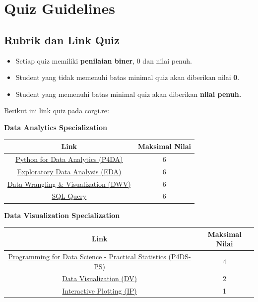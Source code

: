 \documentclass[
]{book}
\providecommand{\tightlist}{%
  \setlength{\itemsep}{0pt}\setlength{\parskip}{0pt}}
\begin{document}
\hypertarget{quiz-guidelines}{%
\section{Quiz Guidelines}\label{quiz-guidelines}}

\hypertarget{rubrik-dan-link-quiz}{%
\subsection{Rubrik dan Link Quiz}\label{rubrik-dan-link-quiz}}

\begin{itemize}
\tightlist
\item
  Setiap quiz memiliki \textbf{penilaian biner}, 0 dan nilai penuh.
\item
  Student yang tidak memenuhi batas minimal quiz akan diberikan nilai \textbf{0}.
\item
  Student yang memenuhi batas minimal quiz akan diberikan \textbf{nilai penuh.}
\end{itemize}

Berikut ini link quiz pada \url{corgi.re}:

\textbf{Data Analytics Specialization}

\begin{longtable}[]{@{}cc@{}}
\toprule
\textbf{Link} & \textbf{Maksimal Nilai}\tabularnewline
\midrule
\endhead
\href{https://corgi.re/courses/ttnsy/quiz_PYW1}{Python for Data Analytics (P4DA)} & 6\tabularnewline
\href{https://corgi.re/courses/ttnsy/quiz_PYW2}{Exploratory Data Analysis (EDA)} & 6\tabularnewline
\href{https://corgi.re/courses/ttnsy/quiz_PYW3}{Data Wrangling \& Visualization (DWV)} & 6\tabularnewline
\href{https://corgi.re/courses/ttnsy/quiz_PYW4}{SQL Query} & 6\tabularnewline
\bottomrule
\end{longtable}

\textbf{Data Visualization Specialization}

\begin{longtable}[]{@{}cc@{}}
\toprule
\textbf{Link} & \textbf{Maksimal Nilai}\tabularnewline
\midrule
\endhead
\href{https://corgi.re/courses/Davidlimbong/P4DS-PS}{Programming for Data Science - Practical Statistics (P4DS-PS)} & 4\tabularnewline
\href{https://corgi.re/courses/Argaadya/data-visualization}{Data Visualization (DV)} & 2\tabularnewline
\href{https://corgi.re/courses/Davidlimbong/InteractivePlotting}{Interactive Plotting (IP)} & 1\tabularnewline
\bottomrule
\end{longtable}
\end{document}
